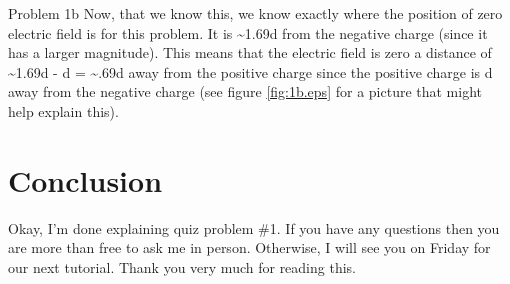 \begin{homeworkProblem}
\begin{homeworkSection}{Problem 1b}
Now, that we know this, we know exactly where the position of zero electric field is for this problem. It is \textasciitilde1.69d from the negative charge (since it has a larger magnitude). This means that the electric field is zero a distance of  \textasciitilde 1.69d - d = \textasciitilde.69d away from the positive charge since the positive charge is d away from the negative charge (see figure \ref{fig:1b.eps} for a picture that might help explain this).
\end{homeworkSection}

\section{Conclusion}
Okay, I'm done explaining quiz problem \#1. If you have any questions then you are more than free to ask me in person. Otherwise, I will see you on Friday for our next tutorial. Thank you very much for reading this.
\end{homeworkProblem}

